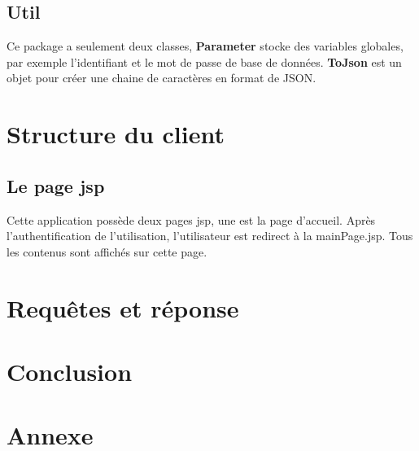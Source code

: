 \documentclass[14px]{article}
\begin{document}
\subsection{Util}
Ce package a seulement deux classes, \textbf{Parameter} stocke des variables globales, par exemple l'identifiant et le mot de passe de base de données. \textbf{ToJson} est un objet pour créer une chaine de caractères en format de JSON.

\section{Structure du client}
\subsection{Le page jsp}
Cette application possède deux pages jsp, une est la page d'accueil. Après l'authentification de l'utilisation, l'utilisateur est redirect à la mainPage.jsp. Tous les contenus sont affichés sur cette page.




\section{Requêtes et réponse}

\section{Conclusion}

\section{Annexe}
\begin{figure1}
\end{figure1}
\end{document}
